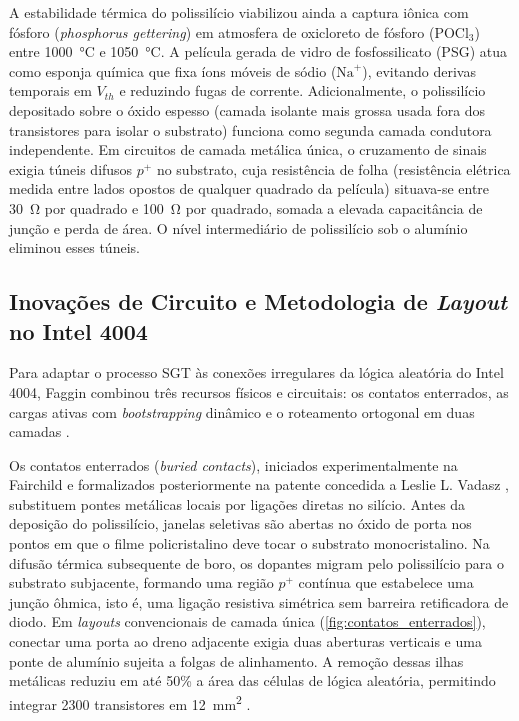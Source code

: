 A estabilidade térmica do polissilício viabilizou ainda a captura iônica com fósforo (\textit{phosphorus gettering}) em atmosfera de oxicloreto de fósforo ($\text{POCl}_3$) entre \SI{1000}{\celsius} e \SI{1050}{\celsius}. A película gerada de vidro de fosfossilicato (PSG) atua como esponja química que fixa íons móveis de sódio ($\text{Na}^+$), evitando derivas temporais em $V_{th}$ e reduzindo fugas de corrente. Adicionalmente, o polissilício depositado sobre o óxido espesso (camada isolante mais grossa usada fora dos transistores para isolar o substrato) funciona como segunda camada condutora independente. Em circuitos de camada metálica única, o cruzamento de sinais exigia túneis difusos $p^+$ no substrato, cuja resistência de folha (resistência elétrica medida entre lados opostos de qualquer quadrado da película) situava-se entre \SI{30}{\ohm} por quadrado e \SI{100}{\ohm} por quadrado, somada a elevada capacitância de junção e perda de área. O nível intermediário de polissilício sob o alumínio eliminou esses túneis.

\subsection{Inovações de Circuito e Metodologia de \textit{Layout} no Intel 4004}
\label{subsec:inovacoes_circuito_leiaute}

Para adaptar o processo SGT às conexões irregulares da lógica aleatória do Intel 4004, Faggin combinou três recursos físicos e circuitais: os contatos enterrados, as cargas ativas com \textit{bootstrapping} dinâmico e o roteamento ortogonal em duas camadas \cite{faggin1996, faggin2021}.

Os contatos enterrados (\textit{buried contacts}), iniciados experimentalmente na Fairchild e formalizados posteriormente na patente concedida a Leslie L. Vadasz \cite{vadasz1972patent, faggin1996, faggin2021}, substituem pontes metálicas locais por ligações diretas no silício. Antes da deposição do polissilício, janelas seletivas são abertas no óxido de porta nos pontos em que o filme policristalino deve tocar o substrato monocristalino. Na difusão térmica subsequente de boro, os dopantes migram pelo polissilício para o substrato subjacente, formando uma região $p^+$ contínua que estabelece uma junção ôhmica, isto é, uma ligação resistiva simétrica sem barreira retificadora de diodo. Em \textit{layouts} convencionais de camada única (\cref{fig:contatos_enterrados}), conectar uma porta ao dreno adjacente exigia duas aberturas verticais e uma ponte de alumínio sujeita a folgas de alinhamento. A remoção dessas ilhas metálicas reduziu em até 50\% a área das células de lógica aleatória, permitindo integrar \num{2300} transistores em \SI{12}{\milli\meter\squared} \cite{faggin1996, faggin2021}.

